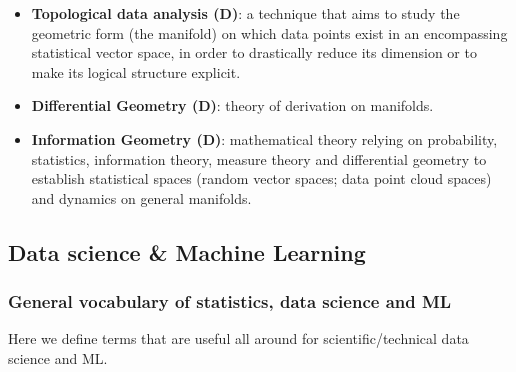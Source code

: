 \documentclass{article}
\begin{document}
\begin{itemize}
    \item \textbf{Topological data analysis (D)}: a technique that aims to study the geometric form (the manifold) on which data points exist in an encompassing statistical vector space, in order to drastically reduce its dimension or to make its logical structure explicit. 
    
    \item \textbf{Differential Geometry (D)}: theory of derivation on manifolds.
    
    \item \textbf{Information Geometry (D)}: mathematical theory relying on probability, statistics, information theory, measure theory and differential geometry to establish statistical spaces (random vector spaces; data point cloud spaces) and dynamics on general manifolds.
\end{itemize}



\subsection*{Data science \& Machine Learning}

\subsubsection*{General vocabulary of statistics, data science and ML}

Here we define terms that are useful all around for scientific/technical data science and ML.
\end{document}
